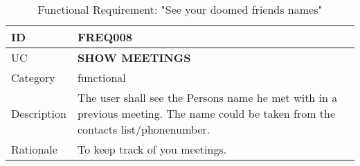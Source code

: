 \begin{flushleft}
\vspace{5mm}
\begin{table}[H]
	\begin{tabular}{ |p{2cm}||p{9cm}| }
		\hline
        ID & \textbf{FREQ008}\\ \hline
        UC & \textbf{SHOW MEETINGS} \\ \hline
		Category & functional \\ \hline
		Description &
		The user shall see the Persons name he met with in a previous meeting.
		The name could be taken from the contacts list/phonenumber.
		\\ \hline
		Rationale & To keep track of you meetings. \\ \hline
	\end{tabular}
	\caption{Functional Requirement: "See your doomed friends names"}
\end{table}


\end{flushleft}
